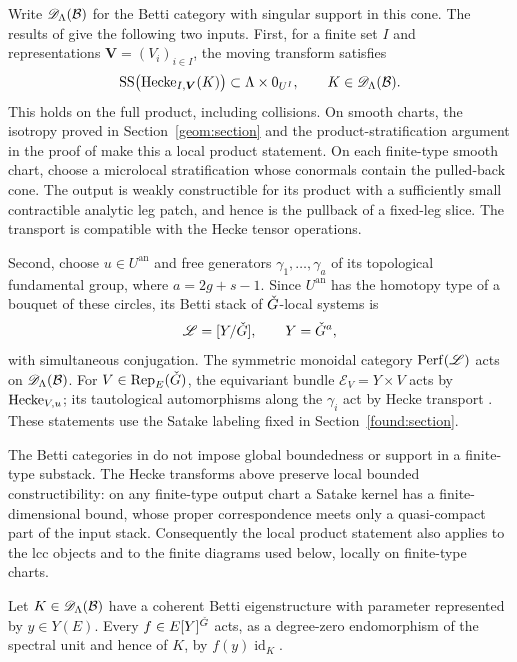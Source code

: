 Write $\mathscr D_\Lambda(\mathcal B)$ for the Betti category with singular
support in this cone.  The results of
\cite[Theorem~6.2.2, Proposition~6.3.2, \S6.3.6, and Theorem~6.3.7]{NY}
give the following two inputs.
First, for a finite set $I$ and representations
$\boldsymbol V=(V_i)_{i\in I}$, the moving transform satisfies
\begin{equation}\label{perv:leg-support}
 \operatorname{SS}\bigl(\operatorname{Hecke}_{I,\boldsymbol V}(K)\bigr)
       \subset \Lambda\times 0_{U^I},
       \qquad K\in\mathscr D_\Lambda(\mathcal B).
\end{equation}
This holds on the full product, including collisions.  On smooth charts,
the isotropy proved in Section~\ref{geom:section} and the
product-stratification argument in the proof of
\cite[Proposition~6.3.2 and \S6.3.6]{NY} make
this a local product statement.  On each finite-type smooth chart,
choose a microlocal stratification whose conormals contain the
pulled-back cone.  The output is weakly constructible for its product with a
sufficiently small contractible analytic leg patch, and hence is the
pullback of a fixed-leg slice.
The transport is compatible with the Hecke tensor operations.

Second, choose $u\in U^{\mathrm{an}}$ and free generators
$\gamma_1,\ldots,\gamma_a$ of its topological fundamental group, where
$a=2g+s-1$.  Since $U^{\mathrm{an}}$ has the homotopy type of a bouquet
of these circles, its Betti stack of $\check G$-local systems is
\[
 \mathscr L=[Y/\check G],\qquad Y=\check G^{a},
\]
with simultaneous conjugation.  The symmetric monoidal category
$\operatorname{Perf}(\mathscr L)$ acts on $\mathscr D_\Lambda(\mathcal B)$.  For
$V\in\operatorname{Rep}_E(\check G)$, the equivariant bundle
$\mathscr E_V=Y\times V$ acts by $\operatorname{Hecke}_{V,u}$; its tautological
automorphisms along the $\gamma_i$ act by Hecke transport
\cite[Proposition~6.3.3 and \S6.3.6]{NY}.
These statements use the Satake labeling fixed in
Section~\ref{found:section}.

The Betti categories in \cite[\S5.1 and \S6.2]{NY} do not impose global
boundedness or support in a finite-type substack.  The Hecke transforms
above preserve local bounded constructibility: on any finite-type output
chart a Satake kernel has a finite-dimensional bound, whose proper
correspondence meets only a quasi-compact part of the input stack.
Consequently the local product statement also applies to the lcc objects
and to the finite diagrams used below, locally on finite-type charts.

\begin{lemma}\label{perv:scalar}
Let $K\in\mathscr D_\Lambda(\mathcal B)$ have a coherent Betti eigenstructure
with parameter represented by $y\in Y(E)$.  Every
$f\in E[Y]^{\check G}$ acts, as a degree-zero endomorphism of the spectral
unit and hence of $K$, by $f(y)\operatorname{id}_K$.
\end{lemma}

